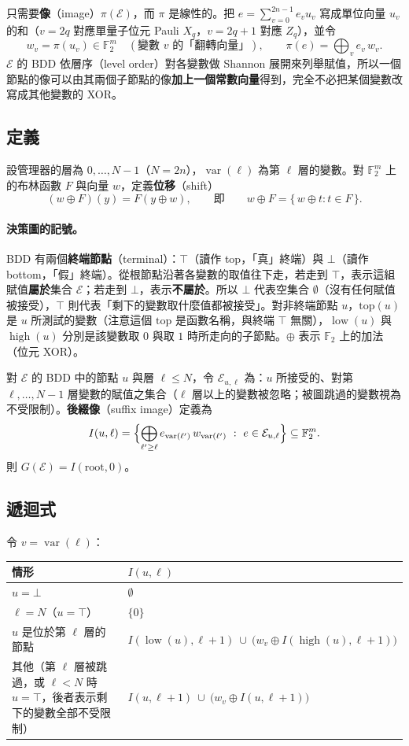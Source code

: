 \documentclass[a4paper,11pt,fontset=none]{ctexart}
\renewcommand{\emph}[1]{\textbf{#1}}
\newcommand{\F}{\mathbb{F}}
\newcommand{\E}{\mathcal{E}}
\newcommand{\ra}{\mathrm{root}}
\DeclareMathOperator{\var}{var}
\DeclareMathOperator{\low}{low}
\DeclareMathOperator{\high}{high}
\theoremstyle{definition}
\begin{document}
只需要\emph{像}（image）$\pi(\E)$，而 $\pi$ 是線性的。把 $e=\sum_{v=0}^{2n-1}e_v u_v$ 寫成單位向量 $u_v$ 的和（$v=2q$ 對應單量子位元 Pauli $X_q$，$v=2q+1$ 對應 $Z_q$），並令
\[
w_v=\pi(u_v)\in\F_2^{m}\quad(\text{變數 }v\text{ 的「翻轉向量」}),\qquad
\pi(e)=\bigoplus_{v}e_v\,w_v .
\]
$\E$ 的 BDD 依層序（level order）對各變數做 Shannon 展開來列舉賦值，所以一個節點的像可以由其兩個子節點的像\emph{加上一個常數向量}得到，完全不必把某個變數改寫成其他變數的 XOR。

\subsection{定義}

設管理器的層為 $0,\dots,N-1$（$N=2n$），$\var(\ell)$ 為第 $\ell$ 層的變數。對 $\F_2^m$ 上的布林函數 $F$ 與向量 $w$，定義\emph{位移}（shift）
\[
(w\oplus F)(y)=F(y\oplus w),\qquad\text{即}\qquad w\oplus F=\{\,w\oplus t:t\in F\,\}.
\]
\paragraph{決策圖的記號。}BDD 有兩個\emph{終端節點}（terminal）：$\top$（讀作 top，「真」終端）與 $\bot$（讀作 bottom，「假」終端）。從根節點沿著各變數的取值往下走，若走到 $\top$，表示這組賦值\emph{屬於}集合 $\E$；若走到 $\bot$，表示\emph{不屬於}。所以 $\bot$ 代表空集合 $\emptyset$（沒有任何賦值被接受），$\top$ 則代表「剩下的變數取什麼值都被接受」。對非終端節點 $u$，$\mathrm{top}(u)$ 是 $u$ 所測試的變數（注意這個 $\mathrm{top}$ 是函數名稱，與終端 $\top$ 無關），$\low(u)$ 與 $\high(u)$ 分別是該變數取 $0$ 與取 $1$ 時所走向的子節點。$\oplus$ 表示 $\F_2$ 上的加法（位元 XOR）。

對 $\E$ 的 BDD 中的節點 $u$ 與層 $\ell\le N$，令 $\E_{u,\ell}$ 為：$u$ 所接受的、對第 $\ell,\dots,N-1$ 層變數的賦值之集合（$\ell$ 層以上的變數被忽略；被圖跳過的變數視為不受限制）。\emph{後綴像}（suffix image）定義為
\[
I(u,\ell)=\Bigl\{\bigoplus_{\ell'\ge\ell}e_{\var(\ell')}\,w_{\var(\ell')}\ :\ e\in\E_{u,\ell}\Bigr\}\subseteq\F_2^{m}.
\]
則 $G(\E)=I(\ra,0)$。

\subsection{遞迴式}\label{sec:rec}

令 $v=\var(\ell)$：
\begin{center}
\begin{tabular}{@{}p{}l@{}}
\toprule
情形 & $I(u,\ell)$\\
\midrule
$u=\bot$ & $\emptyset$\\
$\ell=N$（$u=\top$） & $\{0\}$\\
$u$ 是位於第 $\ell$ 層的節點 & $I(\low(u),\ell{+}1)\ \cup\ \bigl(w_v\oplus I(\high(u),\ell{+}1)\bigr)$\\
其他（第 $\ell$ 層被跳過，或 $\ell<N$ 時 $u=\top$，後者表示剩下的變數全部不受限制） & $I(u,\ell{+}1)\ \cup\ \bigl(w_v\oplus I(u,\ell{+}1)\bigr)$\\
\bottomrule
\end{tabular}
\end{center}
\end{document}
